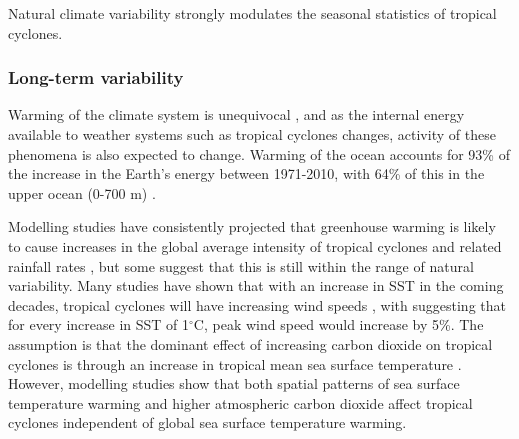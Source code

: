 
Natural climate variability strongly modulates the seasonal statistics of tropical cyclones. 


\subsubsection{Long-term variability}

Warming of the climate system is unequivocal \citep{stocker2013ipccb}, and as the internal energy available to weather systems such as tropical cyclones changes, activity of these phenomena is also expected to change. Warming of the ocean accounts for 93\% of the increase in the Earth's energy between 1971-2010, with 64\% of this in the upper ocean (0-700 m) \citep{rhein2013chapter}.

Modelling studies have consistently projected that greenhouse warming is likely to cause increases in the global average intensity of tropical cyclones and related rainfall rates \citep[e.g.][]{hill2011impact, knutson2010tropical, elsner2008increasing, bender2010modeled}, but some suggest that this is still within the range of natural variability. Many studies have shown that with an increase in SST in the coming decades, tropical cyclones will have increasing wind speeds \citep{bender2010modeled, murakami2012future, webster2005changes, emanuel2005increasing, knutson2010tropical, elsner2008increasing}, with \cite{emanuel2005increasing} suggesting that for every increase in SST of 1$^{\circ}$C, peak wind speed would increase by 5\%. The assumption is that the dominant effect of increasing carbon dioxide on tropical cyclones is through an increase in tropical mean sea surface temperature \citep{zhao2013robust}. However, modelling studies show that both spatial patterns of sea surface temperature warming and higher atmospheric carbon dioxide affect tropical cyclones independent of global sea surface temperature warming. %

